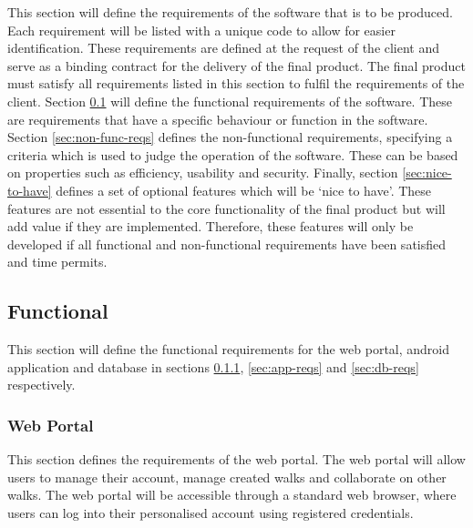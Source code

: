 \documentclass[11pt,a4paper]{article}
\begin{document}
This section will define the requirements of the software that is to be produced.
Each requirement will be listed with a unique code to allow for easier identification.
These requirements are defined at the request of the client and serve as a binding contract for the delivery of the final product.
The final product must satisfy all requirements listed in this section to fulfil the requirements of the client.
Section \ref{sec:func-reqs} will define the functional requirements of the software. These are requirements that have a specific behaviour or function in the software. 
Section \ref{sec:non-func-reqs} defines the non-functional requirements, specifying a criteria which is used to judge the operation of the software.
These can be based on properties such as efficiency, usability and security.
Finally, section \ref{sec:nice-to-have} defines a set of optional features which will be `nice to have'.
These features are not essential to the core functionality of the final product but will add value if they are implemented.
Therefore, these features will only be developed if all functional and non-functional requirements have been satisfied and time permits.

\subsection{Functional}
\label{sec:func-reqs}

This section will define the functional requirements for the web portal, android application and database in sections \ref{sec:req-reg-login}, \ref{sec:app-reqs} and \ref{sec:db-reqs} respectively.

\subsubsection{Web Portal}
\label{sec:req-reg-login}

This section defines the requirements of the web portal. 
The web portal will allow users to manage their account, manage created walks and collaborate on other walks.
The web portal will be accessible through a standard web browser, where users can log into their personalised account using registered credentials.
\end{document}
